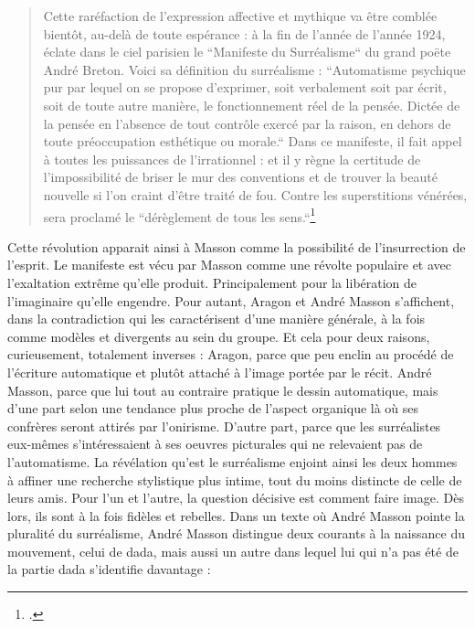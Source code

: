 \begin{quote}Cette raréfaction de l’expression affective et mythique va être comblée bientôt, au-delà de toute espérance : à la fin de l’année de l’année 1924, éclate dans le ciel parisien le “Manifeste du Surréalisme“ du grand poëte André Breton. Voici sa définition du surréalisme : “Automatisme psychique pur par lequel on se propose d’exprimer, soit verbalement soit par écrit, soit de toute autre manière, le fonctionnement réel de la pensée. Dictée de la pensée en l’absence de tout contrôle exercé par la raison, en dehors de toute préoccupation esthétique ou morale.“ Dans ce manifeste, il fait appel à toutes les puissances de l’irrationnel : et il y règne la certitude de l’impossibilité de briser le mur des conventions et de trouver la beauté nouvelle si l’on craint d’être traité de fou. Contre les superstitions vénérées, sera proclamé le “dérèglement de tous les sens.“\footcite[p21]{rebelle}\end{quote}

	
		
Cette révolution apparait ainsi à Masson comme la possibilité de l’insurrection de l’esprit. Le manifeste est vécu par Masson comme une révolte populaire et avec l’exaltation extrême qu’elle produit. Principalement pour la libération de l’imaginaire qu’elle engendre. Pour autant, Aragon et André Masson s’affichent, dans la contradiction qui les caractérisent d’une manière générale, à la fois comme modèles et divergents au sein du groupe. Et cela pour deux raisons, curieusement, totalement inverses : Aragon, parce que peu enclin au procédé de l’écriture automatique et plutôt attaché à l’image portée par le récit. André Masson, parce que lui tout au contraire pratique le dessin automatique, mais d’une part selon une tendance plus proche de l’aspect organique là où ses confrères seront attirés par l’onirisme. D’autre part, parce que les surréalistes  eux-mêmes s’intéressaient à ses oeuvres picturales qui ne relevaient pas de l’automatisme.  La révélation qu’est le surréalisme enjoint ainsi les deux hommes à affiner une recherche stylistique plus intime, tout du moins distincte de celle de leurs amis. Pour l’un et l’autre, la question décisive est comment faire image. Dès lors, ils sont à la fois fidèles et rebelles. Dans un texte où André Masson pointe la pluralité du surréalisme, André Masson distingue deux courants à la naissance du mouvement, celui de dada, mais aussi un autre dans lequel lui qui n’a pas été de la partie dada s’identifie davantage : 

